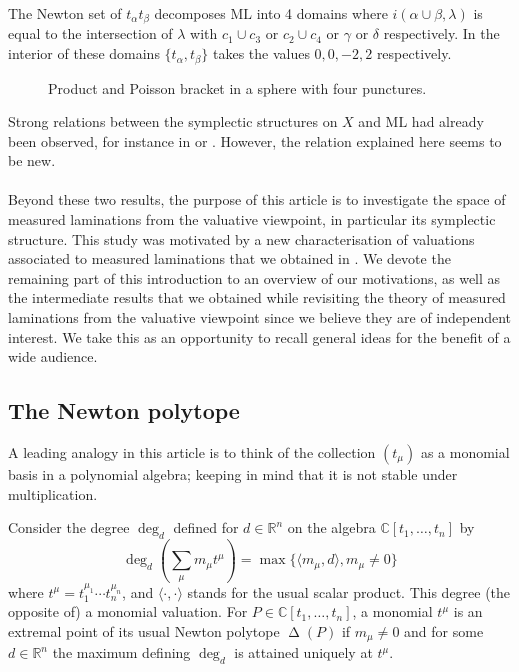 \documentclass{amsart}
\newcommand{\C}{\mathbb{C}}
\newcommand{\R}{\mathbb{R}}
\newcommand{\ML}{\mathrm{ML}}
\DeclareMathOperator{\NewSet}{\Delta}
\begin{document}
The Newton set of $t_\alpha t_\beta$ decomposes $\ML$ into 4 domains where $i(\alpha\cup \beta,\lambda)$ is equal to the intersection of $\lambda$ with $c_1\cup c_3$ or $c_2\cup c_4$ or $\gamma$ or $\delta$ respectively. In the interior of these domains $\{t_\alpha,t_\beta\}$ takes the values $0,0,-2,2$ respectively. 

\begin{figure}[htbp]
    \centering
    \def\svgwidth{7cm}
    
    \caption{Product and Poisson bracket in a sphere with four punctures.}
    \label{fig:sphere}
\end{figure}


Strong relations between the symplectic structures on $X$ and $\ML$ had already been observed, for instance in \cite{Papa-Penner_symplectique-bord_1991} or \cite{Sozen-Bonahon_2001}. However, the relation explained here seems to be new. 

\paragraph{} Beyond these two results, the purpose of this article is to investigate the space of measured laminations from the valuative viewpoint, in particular its symplectic structure. This study was motivated by a new characterisation of valuations associated to measured laminations that we obtained in \cite{MS_Aut(CV)_2020}.
We devote the remaining part of this introduction to an overview of our motivations, as well as the intermediate results that we obtained while revisiting the theory of measured laminations from the valuative viewpoint since we believe they are of independent interest. We take this as an opportunity to recall general ideas for the benefit of a wide audience.


\subsection*{The Newton polytope}

A leading analogy in this article is to think of the collection $(t_\mu)$ as a monomial basis in a polynomial algebra; keeping in mind that it is not stable under multiplication. 

Consider the degree $\deg_d$ defined for $d\in \R^n$ on the algebra $\C[t_1,\ldots,t_n]$ by 
$$\deg_d \left(\sum_\mu m_\mu t^\mu \right)=\max \{\langle m_\mu,d\rangle, m_\mu\ne 0\}$$
where $t^\mu=t_1^{\mu_1}\cdots t_n^{\mu_n}$, and $\langle\cdot,\cdot\rangle$ stands for the usual scalar product. This degree (the opposite of) a monomial valuation.
%
For $P\in \C[t_1,\ldots,t_n]$, a monomial $t^\mu$ is an extremal point of its usual Newton polytope $\NewSet(P)$ if $m_\mu\ne 0$ and for some $d\in \R^n$ the maximum defining $\deg_d$ is attained uniquely at $t^\mu$.
\end{document}
